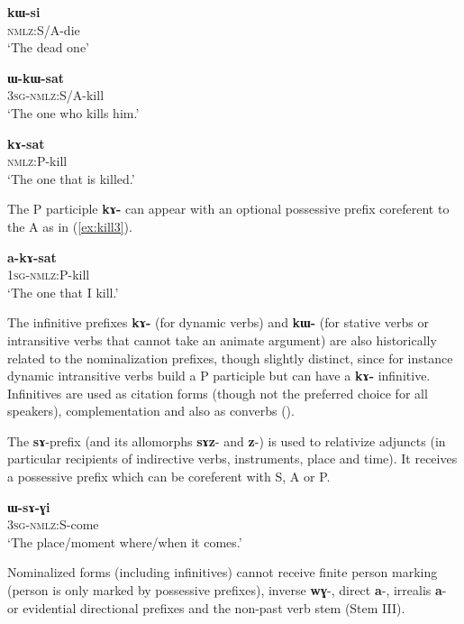 \documentclass[oneside,a4paper,11pt]{article}
\newcommand{\ipa}[1]{\textbf{\phon\mbox{#1}}} %
\newcommand{\refb}[1]{(\ref{#1})}
\begin{document}
 \begin{exe}
\ex \label{ex:die}
\gll \ipa{kɯ-si}    \\
  \textsc{nmlz}:S/A-die \\
 \glt  `The dead one'
 
\ex \label{ex:kill}
\gll \ipa{ɯ-kɯ-sat}    \\
  \textsc{3sg}-\textsc{nmlz}:S/A-kill \\
 \glt  `The one who kills him.'
 

\ex \label{ex:kill2}
\gll \ipa{kɤ-sat}    \\
   \textsc{nmlz}:P-kill \\
 \glt  `The one that is killed.'
 \end{exe}
 
  The P participle \ipa{kɤ-} can appear with an optional possessive prefix coreferent to the A as in \refb{ex:kill3}.
  
  \begin{exe}
\ex \label{ex:kill3}
\gll \ipa{a-kɤ-sat}    \\
   \textsc{1sg-nmlz}:P-kill \\
 \glt  `The one that I kill.'
 \end{exe} 
 
The infinitive prefixes  \ipa{kɤ-} (for dynamic verbs) and \ipa{kɯ-} (for stative verbs or intransitive verbs that cannot take an animate argument) are also historically related to the nominalization prefixes, though slightly distinct, since for instance dynamic intransitive verbs build a P participle but can have a \ipa{kɤ-} infinitive. Infinitives are used as citation forms (though not the preferred choice for all speakers), complementation and also as converbs (\citealt{jacques14linking}).
 
 The \ipa{sɤ}-prefix (and its allomorphs \ipa{sɤz}- and \ipa{z}-) is used to relativize adjuncts (in particular recipients of indirective verbs, instruments, place and time).  It receives a possessive prefix  which can be coreferent with S, A or P.

   \begin{exe}
\ex \label{ex:come}
\gll \ipa{ɯ-sɤ-ɣi}    \\
   \textsc{3sg-nmlz}:S-come \\
 \glt  `The place/moment where/when it comes.'
 \end{exe}

Nominalized forms (including infinitives) cannot receive finite person marking (person is only marked by possessive prefixes), inverse \ipa{wɣ}-, direct \ipa{a}-, irrealis \ipa{a}- or evidential directional prefixes and the non-past verb stem (Stem III).
 
\end{document}

